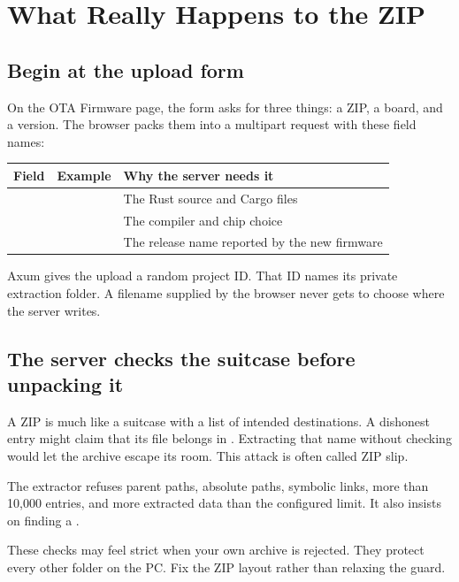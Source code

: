 \chapter{What Really Happens to the ZIP}

\section{Begin at the upload form}

On the OTA Firmware page, the form asks for three things: a ZIP, a board, and a version. The browser packs them into a multipart request with these field names:

\begin{center}
\begin{tabularx}{0.9\textwidth}{l l Y}
\toprule
Field & Example & Why the server needs it\\
\midrule
{} &  & The Rust source and Cargo files\\
 &  & The compiler and chip choice\\
 &  & The release name reported by the new firmware\\
\bottomrule
\end{tabularx}
\end{center}

Axum gives the upload a random project ID. That ID names its private extraction folder. A filename supplied by the browser never gets to choose where the server writes.

\section{The server checks the suitcase before unpacking it}

A ZIP is much like a suitcase with a list of intended destinations. A dishonest entry might claim that its file belongs in . Extracting that name without checking would let the archive escape its room. This attack is often called ZIP slip.

The extractor refuses parent paths, absolute paths, symbolic links, more than 10,000 entries, and more extracted data than the configured limit. It also insists on finding a .

These checks may feel strict when your own archive is rejected. They protect every other folder on the PC. Fix the ZIP layout rather than relaxing the guard.

